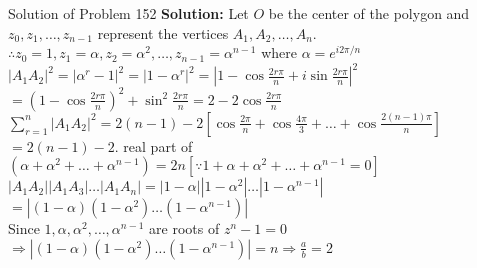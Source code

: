 \documentclass[aspectratio=169,8pt]{beamer}
\begin{document}
\begin{frame}{Solution of Problem 152}
  \textbf{Solution:} Let $O$ be the center of the polygon and $z_0, z_1, \ldots, z_{n - 1}$ represent the vertices $A_1, A_2,
  \ldots, A_n$.\\
  \vspace*{0.2cm}
  $\therefore z_0 = 1, z_1 = \alpha, z_2 = \alpha^2, \ldots, z_{n - 1} = \alpha^{n - 1}$ where $\alpha = e^{i2\pi/n}$\\
  \vspace*{0.2cm}
  $|A_1A_2|^2 =|\alpha^r - 1|^2 = |1 - \alpha^r|^2 = \left|1 - \cos\frac{2r\pi}{n} + i\sin\frac{2r\pi}{n}\right|^2$\\
  \vspace*{0.2cm}
  $= \left(1 - \cos\frac{2r\pi}{n}\right)^2 + \sin^2\frac{2r\pi}{n} = 2 - 2\cos\frac{2r\pi}{n}$\\
  \vspace*{0.2cm}
  $\sum_{r=1}^n |A_1A_2|^2 = 2(n - 1) - 2\left[\cos\frac{2\pi}{n} + \cos\frac{4\pi}{3} + \ldots + \cos\frac{2(n -
      1)\pi}{n}\right]$\\
  \vspace*{0.2cm}
  $= 2(n - 1) -2.$ real part of $(\alpha + \alpha^2 + \ldots + \alpha^{n - 1}) = 2n [\because 1 + \alpha + \alpha^2 + \ldots +
    \alpha^{n - 1} = 0]$\\
  \vspace*{0.2cm}
  $|A_1A_2||A_1A_3|\ldots |A_1A_n| = |1 - \alpha||1 - \alpha^2|\ldots|1 - \alpha^{n - 1}|$\\
  \vspace*{0.2cm}
  $= |(1 - \alpha)(1 - \alpha^2)\ldots(1 - \alpha^{n - 1})|$\\
  Since $1, \alpha, \alpha^2, \ldots, \alpha^{n - 1}$ are roots of $z^n - 1 = 0$\\
  \vspace*{0.2cm}
  $\Rightarrow |(1 - \alpha)(1 - \alpha^2)\ldots(1 - \alpha^{n - 1})| = n \Rightarrow \frac{a}{b} = 2$
\end{frame}
\end{document}
